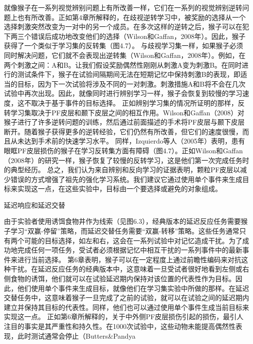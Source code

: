 就像猴子在一系列视觉辨别问题上有所改善一样，它们在一系列的视觉辨别逆转问题上也有所改善。正如第4章所解释的，在歧视逆转学习中，被奖励的选择从一个选择刺激突然改变为一对中的另一个成员。在多次这样的逆转之后，猴子可以在犯下两三个错误后成功地改变他们的选择（Wilson和Gaffan，2008年）。因此，猴子获得了一个类似于学习集的反转集（图4.7）。
与歧视学习集一样，如果猴子必须同时解决问题，它们就不会表现出逆转集（Wilson和Gaffan，2008年）。例如，在两个刺激之间：A和B。让我们假设奖励偶然性刚刚从刺激A变为刺激B。在同时进行的测试条件下，猴子在试验间隔期间无法在短期记忆中保持刺激B的表现，即适当的目标，因为下一次试验将涉及不同的一对刺激。刺激措施A和B将不会在几次试验中再次出现。因此，就像同时进行辨别学习一样，猴子会恢复到较慢的学习速度，这不取决于基于事件的目标选择。
正如辨别学习集的情况所证明的那样，反转学习集取决于PF皮层和颞下皮层之间的相互作用。Wilson和Gaffan（2008）对猴子进行了许多逆转问题的训练，然后通过前面描述的手术将PF皮层与颞下皮层断开。随着猴子获得更多的逆转经验，它们仍然有所改善，但它们的速度很慢，而且从未达到手术前的快速学习水平。
同样，Izquierdo等人（2005年）表明，患有眼眶PF皮层损伤的猴子在学习反转集方面有障碍（图4.7）。正如Wilson和Gaffan（2008年）的研究一样，猴子恢复了较慢的反转学习，这是他们第一次完成任务时的典型经历。
总之，我们认为来自辨别和反向学习的证据表明，颗粒PF皮层以减少错误的方式增强了祖先的强化学习系统。我们建议它通过使用单个事件来生成目标来实现这一点，在这些实验中，目标由一个要选择或避免的对象组成。

延迟响应和延迟交替

由于实验者使用诱饵食物井作为线索（见图6.3），经典版本的延迟反应任务需要猴子学习“双赢-停留”策略，而延迟交替任务需要“双赢-转移”策略。这些任务通常只有两个可能的目标选择，如左和右，这会在一系列试验中对记忆造成干扰。为了成功地完成任何一项任务，受试者必须根据记忆中相互干扰的一系列事件中的最新事件来进行当前选择。
第6章表明，猴子可以在一定程度上通过前瞻性编码来对抗这种干扰。在延迟反应任务的经典版本中，这意味着一旦受试者很好地看到左侧或右侧食物的诱饵，他们就可以在试验延迟期内保持对该位置的代表性作为目标。因此，他们使用单个事件来生成目标，就像他们在学习集实验中所做的那样。在延迟交替任务中，这意味着猴子一旦完成了之前的试验，就可以在试验之间的延迟期内建立并保持其目标的代表性。同样，他们也可以通过使用单个事件生成当前目标来实现这一点。
正如第6章所解释的，关于中外侧PF皮层损伤引起的损伤，最引人注目的事实是其严重性和持久性。在1000次试验中，这些动物未能提高偶然性表现，此时测试通常会停止（Butters\&Pandya




